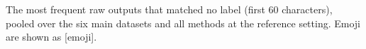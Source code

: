 \begin{table}[t]
  \centering
  \scriptsize
  \setlength{\tabcolsep}{3pt}
  
  \caption{The most frequent raw outputs that matched no label (first 60 characters), pooled over the six main datasets and all methods at the reference setting. Emoji are shown as [emoji].}
  \label{tab:invalid_raw} %
\end{table}

